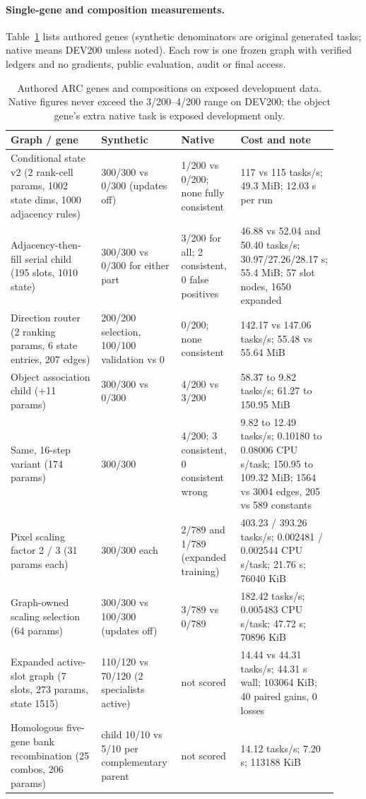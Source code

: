 \documentclass[11pt]{article}
\begin{document}
\paragraph{Single-gene and composition measurements.} Table~\ref{tab:genes} lists authored genes
(synthetic denominators are original generated tasks; native means DEV200 unless noted). Each row is
one frozen graph with verified ledgers and no gradients, public evaluation, audit or final access.
\begin{table}[!htbp]
\centering\footnotesize
\begin{tabular}{@{}p{0.26\linewidth}p{0.20\linewidth}p{0.17\linewidth}p{0.29\linewidth}@{}}
\toprule
Graph / gene & Synthetic & Native & Cost and note\\
\midrule
Conditional state v2 (2 rank-cell params, 1002 state dims, 1000 adjacency rules) & 300/300 vs 0/300 (updates off) & 1/200 vs 0/200; none fully consistent & 117 vs 115 tasks/s; 49.3 MiB; 12.03 s per run\\
Adjacency-then-fill serial child (195 slots, 1010 state) & 300/300 vs 0/300 for either part & 3/200 for all; 2 consistent, 0 false positives & 46.88 vs 52.04 and 50.40 tasks/s; 30.97/27.26/28.17 s; 55.4 MiB; 57 slot nodes, 1650 expanded\\
Direction router (2 ranking params, 6 state entries, 207 edges) & 200/200 selection, 100/100 validation vs 0 & 0/200; none consistent & 142.17 vs 147.06 tasks/s; 55.48 vs 55.64 MiB\\
Object association child (+11 params) & 300/300 vs 0/300 & 4/200 vs 3/200 & 58.37 to 9.82 tasks/s; 61.27 to 150.95 MiB\\
Same, 16-step variant (174 params) & 300/300 & 4/200; 3 consistent, 0 consistent wrong & 9.82 to 12.49 tasks/s; 0.10180 to 0.08006 CPU s/task; 150.95 to 109.32 MiB; 1564 vs 3004 edges, 205 vs 589 constants\\
Pixel scaling factor 2 / 3 (31 params each) & 300/300 each & 2/789 and 1/789 (expanded training) & 403.23 / 393.26 tasks/s; 0.002481 / 0.002544 CPU s/task; 21.76 s; 76040 KiB\\
Graph-owned scaling selection (64 params) & 300/300 vs 100/300 (updates off) & 3/789 vs 0/789 & 182.42 tasks/s; 0.005483 CPU s/task; 47.72 s; 70896 KiB\\
Expanded active-slot graph (7 slots, 273 params, state 1515) & 110/120 vs 70/120 (2 specialists active) & not scored & 14.44 vs 44.31 tasks/s; 44.31 s wall; 103064 KiB; 40 paired gains, 0 losses\\
Homologous five-gene bank recombination (25 combos, 206 params) & child 10/10 vs 5/10 per complementary parent & not scored & 14.12 tasks/s; 7.20 s; 113188 KiB\\
\bottomrule
\end{tabular}
\caption{Authored ARC genes and compositions on exposed development data. Native figures never
exceed the 3/200--4/200 range on DEV200; the object gene's extra native task is exposed
development only.}
\label{tab:genes}
\end{table}
\end{document}
